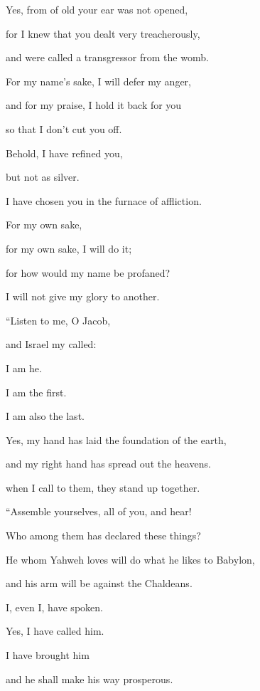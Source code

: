 {\par }{\QB Yes, from of old your ear was not opened,
\par }{\Q for I knew that you dealt very treacherously,
\par }{\QB and were called a transgressor from the womb.
\par }{\Q {}For my name’s sake, I will defer my anger,
\par }{\QB and for my praise, I hold it back for you
\par }{\QB so that I don’t cut you off.
\par }{\Q {}Behold, I have refined you,
\par }{\QB but not as silver.
\par }{\QB I have chosen you in the furnace of affliction.
\par }{\Q {}For my own sake,
\par }{\QB for my own sake, I will do it;
\par }{\Q for how would my name be profaned?
\par }{\QB I will not give my glory to another.
\par }{\BB \par }{\Q {}“Listen to me, O Jacob,
\par }{\QB and Israel my called:
\par }{\Q I am he.
\par }{\QB I am the first.
\par }{\QB I am also the last.
\par }{\Q {}Yes, my hand has laid the foundation of the earth,
\par }{\QB and my right hand has spread out the heavens.
\par }{\QB when I call to them, they stand up together.
\par }{\BB \par }{\Q {}“Assemble yourselves, all of you, and hear!
\par }{\QB Who among them has declared these things?
\par }{\Q He whom Yahweh loves will do what he likes to Babylon,
\par }{\QB and his arm will be against the Chaldeans.
\par }{\Q {}I, even I, have spoken.
\par }{\QB Yes, I have called him.
\par }{\Q I have brought him
\par }{\QB and he shall make his way prosperous.
}
